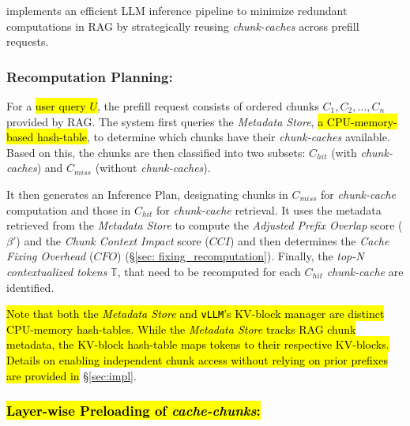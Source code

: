 \sys implements an efficient LLM inference pipeline to minimize redundant computations in RAG by strategically reusing \textit{chunk-caches} across prefill requests.




\subsubsection{Recomputation Planning:} 
\label{sec: request_manager}


For a \hl{user query $U$}, the prefill request consists of ordered chunks \( C_1, C_2, \ldots, C_n \) provided by RAG. The system first queries the \textit{Metadata Store}, \hl{a CPU-memory-based hash-table}, to determine which chunks have their \textit{chunk-caches} available. Based on this, the chunks are then classified into two subsets: \( C_{hit} \) (with \textit{chunk-caches}) and \( C_{miss} \) (without \textit{chunk-caches}). 

It then generates an Inference Plan, designating chunks in \( C_{miss} \) for \textit{chunk-cache} computation and those in \( C_{hit} \) for \textit{chunk-cache} retrieval. It uses the metadata retrieved from the \textit{Metadata Store} to compute the \textit{Adjusted Prefix Overlap} score (\(\beta'\)) and the \textit{Chunk Context Impact} score (\(CCI\)) and then determines the \textit{Cache Fixing Overhead} (\(CFO\)) (\S\ref{sec: fixing_recomputation}). Finally, the \textit{top-N contextualized tokens} \(\mathbb{T}\), that need to be recomputed for each  \( C_{hit} \) \textit{chunk-cache} are identified.


\hl{Note that both the \textit{Metadata Store} and \texttt{vLLM}'s KV-block manager are distinct CPU-memory hash-tables. While the \textit{Metadata Store} tracks RAG chunk metadata, the KV-block hash-table maps tokens to their respective KV-blocks. Details on enabling independent chunk access without relying on prior prefixes are provided in }\S\ref{sec:impl}.




\subsubsection{\hl{Layer-wise Preloading of \textit{cache-chunks}:}}
\label{sec: preloading_kv}

